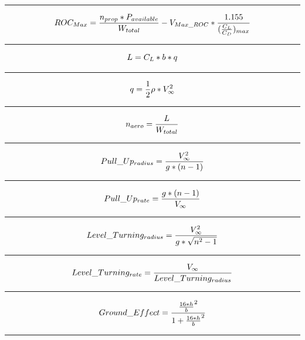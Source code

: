 \documentclass[12pt,A4paper]{article}
\begin{document}
		\hrule
		\vspace{0.1 in}
		\begin{equation}
			ROC_{Max} = \frac{n_{prop}*P_{available}}{W_{total}} - V_{Max\_ROC} * \frac{1.155}{(\frac{C_L}{C_D})_{max}} \\
		\end{equation}
		\hrule
		\vspace{0.1 in}
		\begin{equation}
			L = C_L * b * q \\
		\end{equation}
		\hrule
		\vspace{0.1 in}
		\begin{equation}
			q = \frac{1}{2} \rho * V_\infty^2 \\
		\end{equation}
		\hrule
		\vspace{0.1 in}
		\begin{equation}
			n_{aero} = \frac{L}{W_{total}} \\
		\end{equation}
		\hrule
		\vspace{0.1 in}
		\begin{equation}
			Pull\_Up_{radius} = \frac{V_\infty^2}{g*(n-1)} \\
		\end{equation}
		\hrule
		\vspace{0.1 in}
		\begin{equation}
			Pull\_Up_{rate} = \frac{g*(n-1)}{V_\infty} \\
		\end{equation}
		\hrule
		\vspace{0.1 in}
		\vspace{0.1 in}
		\begin{equation}
			Level\_Turning_{radius} = \frac{V_\infty^2}{g*\sqrt{n^2-1}} \\
		\end{equation}
		\hrule
		\vspace{0.1 in}
		\begin{equation}
			Level\_Turning_{rate} = \frac{V_\infty}{Level\_Turning_{radius}} \\
		\end{equation}
		\hrule
		\vspace{0.1 in}
		\begin{equation}
			Ground\_Effect = \frac{{\frac{16 * h}{b}}^2}{1+{\frac{16 * h}{b}}^2} \\
		\end{equation}
		\hrule
\end{document}

